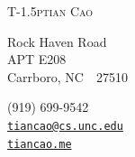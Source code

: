 \documentclass[line,margin]{res}
\begin{document}
\begin{adjustwidth}{-1.3in}{}
	{\Huge
		{\textsc{%
				{T}\kern-1.5ptian
				{C}ao}
		}
	}
	\hfill\hfill\hfill
	{
		\begin{minipage}[b]{2in}
			 Rock Haven Road \\ 
			APT E208 \\ 
			Carrboro, NC~~27510
		\end{minipage}
		\hfill
		\begin{minipage}[b]{1.8in}
			\flushright %
			(919) 699-9542 \, \faPhone \\ 
			\texttt{\href{mailto:tiancao@cs.unc.edu}{tiancao@cs.unc.edu}}\, \faEnvelope \\
			\texttt{\href{http://tiancao.me/}{tiancao.me}}\, \faGlobe 
		\end{minipage}
	}\par
\end{adjustwidth}  

\end{document}
